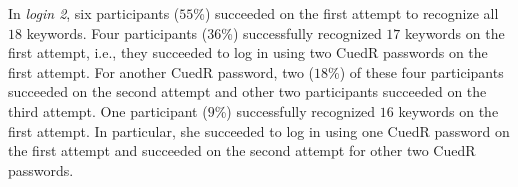 In \textit{login 2}, six participants ($55$\%) succeeded on the first attempt to recognize all $18$ keywords. Four participants ($36$\%) successfully recognized $17$ keywords on the first attempt, i.e., they succeeded to log in using two CuedR passwords on the first attempt. For another CuedR password, two ($18$\%) of these four participants succeeded on the second attempt and other two participants succeeded on the third attempt. One participant ($9$\%) successfully recognized $16$ keywords on the first attempt. In particular, she succeeded to log in using one CuedR password on the first attempt and succeeded on the second attempt for other two CuedR passwords. 











